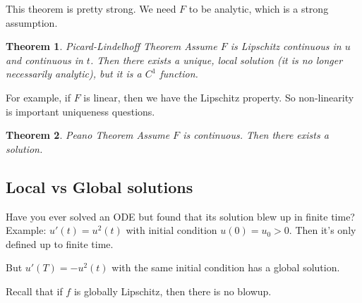 \documentclass{article}
\numberwithin{equation}{section}
\newtheorem{theorem}{Theorem}[section]
\theoremstyle{definition}
\begin{document}
This theorem is pretty strong. We need $F$ to be analytic, which is a strong assumption.

\begin{theorem}Picard-Lindelhoff Theorem
    Assume $F$ is Lipschitz continuous in $u$ and continuous in $t$. Then there exists a unique, local solution (it is no longer necessarily analytic), but it is a $C^1$ function.
\end{theorem}
For example, if $F$ is linear, then we have the Lipschitz property. So non-linearity is important uniqueness questions.
\begin{theorem}Peano Theorem
    Assume $F$ is continuous. Then there exists a solution.
\end{theorem}

\subsection{Local vs Global solutions}
Have you ever solved an ODE but found that its solution blew up in finite time?
Example: $u'(t) = u^2(t)$ with initial condition $u(0) = u_0 > 0$. Then it's only defined up to finite time.

But $u'(T) = -u^2(t)$ with the same initial condition has a global solution.

Recall that if $f$ is globally Lipschitz, then there is no blowup.
\end{document}
